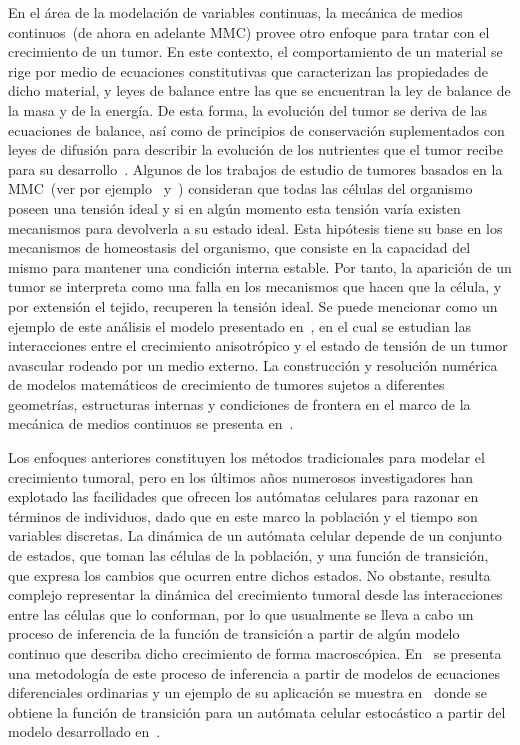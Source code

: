 En el \'area de la modelaci\'on de variables continuas, la mec\'anica de medios continuos~(de ahora en adelante MMC) provee otro enfoque para tratar con el crecimiento de un tumor. En este contexto, el comportamiento de un material se rige por medio de ecuaciones constitutivas que caracterizan las propiedades de dicho material, y leyes de balance entre las que se encuentran la ley de balance de la masa y de la energ\'ia. De esta forma, la evoluci\'on del tumor se deriva de las ecuaciones de balance, as\'i como de principios de conservaci\'on suplementados con leyes de difusi\'on para describir la evoluci\'on de los nutrientes que el tumor recibe para su desarrollo~\cite{ariel}. Algunos de los trabajos de estudio de tumores basados en la MMC~(ver por ejemplo~\cite{preziosi} y~\cite{preziosi2}) consideran que todas las c\'elulas del organismo poseen una tensi\'on ideal y si en alg\'un momento esta tensi\'on var\'ia existen mecanismos para devolverla a su estado ideal. Esta hip\'otesis tiene su base en los mecanismos de homeostasis del organismo, que consiste en la capacidad del mismo para mantener una condici\'on interna estable. Por tanto, la aparici\'on de un tumor se interpreta como una falla en los mecanismos que hacen que la c\'elula, y por extensi\'on el tejido, recuperen la tensi\'on ideal. Se puede mencionar como un ejemplo de este an\'alisis el modelo presentado en~\cite{fernando2}, en el cual se estudian las interacciones entre el crecimiento anisotr\'opico y el estado de tensi\'on de un tumor avascular rodeado por un medio externo. La construcci\'on y resoluci\'on num\'erica de modelos matem\'aticos de crecimiento de tumores sujetos a diferentes geometr\'ias, estructuras internas y condiciones de frontera en el marco de la mec\'anica de medios continuos se presenta en~\cite{ariel2,ariel3}.

Los enfoques anteriores constituyen los m\'etodos tradicionales para modelar el crecimiento tumoral, pero en los \'ultimos a\~nos numerosos investigadores han explotado las facilidades que ofrecen los aut\'omatas celulares para razonar en t\'erminos de individuos, dado que en este marco la poblaci\'on y el tiempo son variables discretas. La din\'amica de un aut\'omata celular depende de un conjunto de estados, que toman las c\'elulas de la poblaci\'on, y una funci\'on de transici\'on, que expresa los cambios que ocurren entre dichos estados. No obstante, resulta complejo representar la din\'amica del crecimiento tumoral desde las interacciones entre las c\'elulas que lo conforman, por lo que usualmente se lleva a cabo un proceso de inferencia de la funci\'on de transici\'on a partir de alg\'un modelo continuo que describa dicho crecimiento de forma macrosc\'opica. En~\cite{guinot} se presenta una metodolog\'ia de este proceso de inferencia a partir de modelos de ecuaciones diferenciales ordinarias y un ejemplo de su aplicaci\'on se muestra en~\cite{ruben} donde se obtiene la funci\'on de transici\'on para un aut\'omata celular estoc\'astico a partir del modelo desarrollado en~\cite{fernando}.

